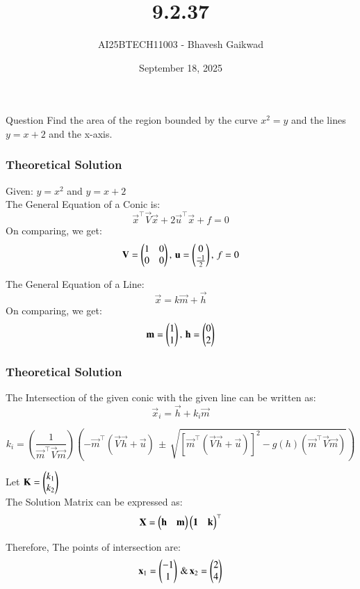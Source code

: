 \documentclass{beamer}
\title
{9.2.37}
\date{September 18, 2025}
\author 
{AI25BTECH11003 - Bhavesh Gaikwad}
\begin{document}
\frame{\titlepage}
\begin{frame}{Question}
Find the area of the region bounded by the curve $x^2 = y$ and the lines $y = x + 2$ and the x-axis.
\end{frame}


\begin{frame}[fragile]
    \frametitle{Theoretical Solution}
Given: $y = x^2$ and $y = x+2$\\

The General Equation of a Conic is: 
\begin{equation}
    \vec{x}^\top\vec{V}\vec{x} + 2\vec{u}^\top\vec{x} + f = 0
\end{equation}
On comparing, we get:
\begin{equation}
    \mathbf{V} = \begin{pmatrix}1 & 0 \\ 0 & 0\end{pmatrix}, \, \mathbf{u} = \begin{pmatrix}0 \\ \frac{-1}{2}\end{pmatrix}, \, f =0
\end{equation}

The General Equation of a Line:
\begin{equation}
    \vec{x} = k\vec{m} + \vec{h}
\end{equation}
On comparing, we get:
\begin{equation}
    \mathbf{m} = \begin{pmatrix}1 \\ 1\end{pmatrix}, \, \mathbf{h} = \begin{pmatrix}0 \\ 2\end{pmatrix}
\end{equation}
\end{frame}


\begin{frame}[fragile]
    \frametitle{Theoretical Solution}
 The Intersection of the given conic with the given line can be written as:
\begin{equation}
    \vec{x}_i = \vec{h} + k_i\vec{m}
\end{equation}

\begin{equation}
k_i = \left( \dfrac{1}{\vec{m}^\top\vec{V}\vec{m}} \right) \left( 
    -\vec{m}^\top(\vec{V}\vec{h}+\vec{u}) \, \pm \, \sqrt{[\vec{m}^\top(\vec{V}\vec{h}+\vec{u})]^2 - g(h)(\vec{m}^\top\vec{V}\vec{m})} \right) 
\end{equation}

Let $\mathbf{K} = \begin{pmatrix}k_1 \\ k_2\end{pmatrix}$\\

The Solution Matrix can be expressed as: 
\begin{equation}
    \mathbf{X} = \begin{pmatrix}\mathbf{h} & \mathbf{m}\end{pmatrix}\begin{pmatrix}\mathbf{1} & \mathbf{k}\end{pmatrix}^\top
\end{equation}

Therefore, The points of intersection are:
\begin{equation}
    \mathbf{x}_1 = \begin{pmatrix}-1 \\ 1\end{pmatrix} \, \& \, \mathbf{x}_2 = \begin{pmatrix}2 \\4\end{pmatrix}
\end{equation}
\end{frame}
\end{document}
